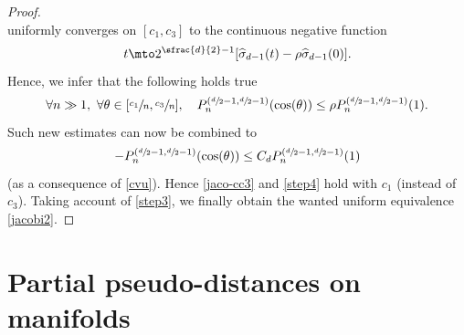 \begin{proof}
\begin{equation*}
\end{equation*}
uniformly converges on $[c_1,c_3]$ to the continuous negative function
\begin{equation*}
t\mto 2^{\sfrac{d}{2}-1}[\widehat{\sigma}_{d-1}(t)-\rho \widehat{\sigma}_{d-1}(0)].
\end{equation*}
Hence, we infer that the following holds true
\begin{equation*}
\forall n\gg 1,\ \forall \theta \in[\sfrac{c_1}{n},\sfrac{c_3}{n}],\quad
P_n^{(\sfrac{d}{2}-1,\sfrac{d}{2}-1)}(\cos(\theta)) \leq\rho P_n^{(\sfrac{d}{2}-1,\sfrac{d}{2}-1)}(1).
\end{equation*}
Such new estimates can now be combined to
\[
-P_n^{(\sfrac{d}{2}-1,\sfrac{d}{2}-1)}(\cos(\theta)) \leq C_d P_n^{(\sfrac{d}{2}-1,\sfrac{d}{2}-1)}(1)
\]
(as a consequence of \eqref{cvu}). Hence
\eqref{jaco-cc3} and \eqref{step4} hold with $c_1$ (instead of $c_3$).
Taking account of \eqref{step3}, we finally obtain the wanted uniform equivalence \eqref{jacobi2}.\end{proof}

\section{Partial pseudo-distances on manifolds}\label{partial2}

